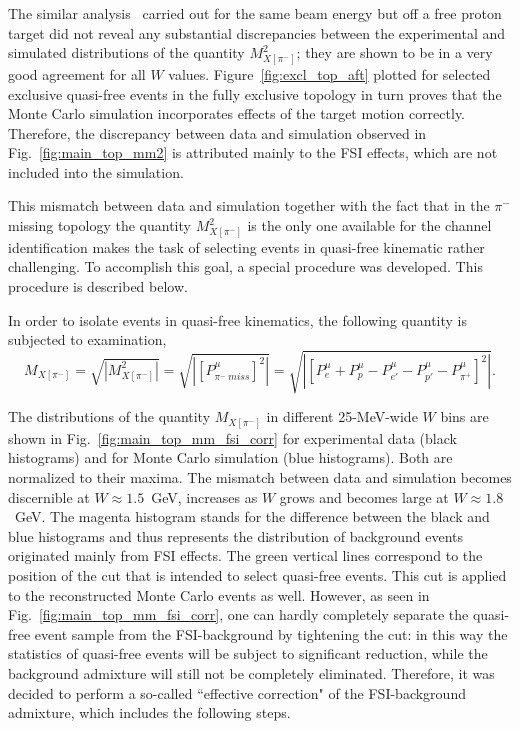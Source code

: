 The similar analysis~\cite{Fed_an_note:2017} carried out for the same beam energy but off a free proton target did not reveal any substantial discrepancies between the experimental and simulated distributions of the quantity $M_{X[\pi^{-}]}^{2}$; they are shown to be in a very good agreement for all $W$ values. Figure~\ref{fig:excl_top_aft} plotted for selected exclusive quasi-free events in the fully exclusive topology in turn proves that the Monte Carlo simulation incorporates effects of the target motion correctly. Therefore, the discrepancy between data and simulation observed in Fig.~\ref{fig:main_top_mm2} is attributed mainly to the FSI effects, which are not included into the simulation.

This mismatch between data and simulation together with the fact that in the $\pi^{-}$ missing topology the quantity $M_{X[\pi^{-}]}^{2}$ is the only one available for the channel identification makes the task of selecting events in quasi-free kinematic rather challenging. To accomplish this goal, a special procedure was developed. This procedure is described below. 

In order to isolate events in quasi-free kinematics, the following quantity is subjected to examination,%
\begin{equation}
 M_{X[\pi^{-}]}=\sqrt{|M_{X[\pi^{-}]}^{2}|}=\sqrt{|[P_{\pi^{-}~miss}^{\mu}]^{2}|}=\sqrt{|[P_{e}^{\mu} + P_{p}^{\mu}- P_{e'}^{\mu}- P_{p'}^{\mu}-  P_{\pi^{+}}^{\mu}]^{2}|}.\label{eq:main_top_mm_nosq}
\end{equation}%


The distributions of the quantity $M_{X[\pi^{-}]}$ in different 25-MeV-wide $W$ bins are shown in Fig.~\ref{fig:main_top_mm_fsi_corr} for experimental data (black histograms) and for Monte Carlo simulation (blue histograms). Both are normalized to their maxima. The mismatch between data and simulation becomes discernible at $W\approx 1.5$~GeV, increases as $W$ grows and becomes large at $W\approx 1.8$~GeV. The magenta histogram stands for the difference between the black and blue histograms and thus represents the distribution of background events originated mainly from FSI effects. The green vertical lines correspond to the position of the cut that is intended to select quasi-free events. This cut is applied to the reconstructed Monte Carlo events as well. However, as seen in Fig.~\ref{fig:main_top_mm_fsi_corr}, one can hardly completely separate the quasi-free event sample from the FSI-background by tightening the cut: in this way the statistics of quasi-free events will be subject to significant reduction, while the background admixture will still not be completely eliminated. Therefore, it was decided to perform a so-called ``effective correction" of the FSI-background admixture, which includes the following steps.

